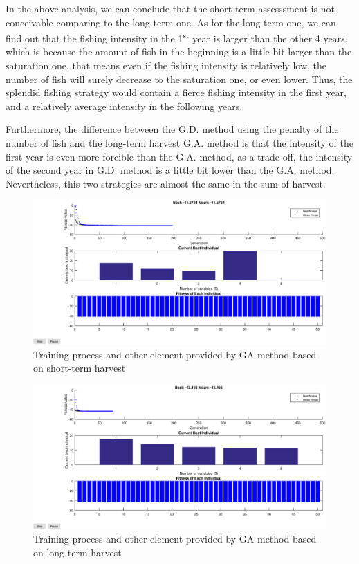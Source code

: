 \documentclass{IEEEtran}
\begin{document}
In the above analysis, we can conclude that the short-term assesssment is not conceivable comparing to the long-term one. As for the long-term one, we can find out that the fishing intensity in the 1\textsuperscript{st} year is larger than the other 4 years, which is because the amount of fish in the beginning is a little bit larger than the saturation one, that means even if the fishing intensity is relatively low, the number of fish will surely decrease to the saturation one, or even lower. Thus, the splendid fishing strategy would contain a fierce fishing intensity in the first year, and a relatively average intensity in the following years. 

Furthermore, the difference between the G.D. method using the penalty of the number of fish and the long-term harvest G.A. method is that the intensity of the first year is even more forcible than the G.A. method, as a trade-off, the intensity of the second year in G.D. method is a little bit lower than the G.A. method. Nevertheless, this two strategies are almost the same in the sum of harvest. 

\begin{figure}[h]
    \includegraphics[width=\columnwidth]{1GA.eps}
\caption{Training process and other element provided by GA method based on short-term harvest}
    \label{fig1}
\end{figure}
\begin{figure}[h]
    \includegraphics[width=\columnwidth]{2GA.eps}
    \caption{Training process and other element provided by GA method based on long-term harvest}
    \label{fig2}
\end{figure}
\end{document}
